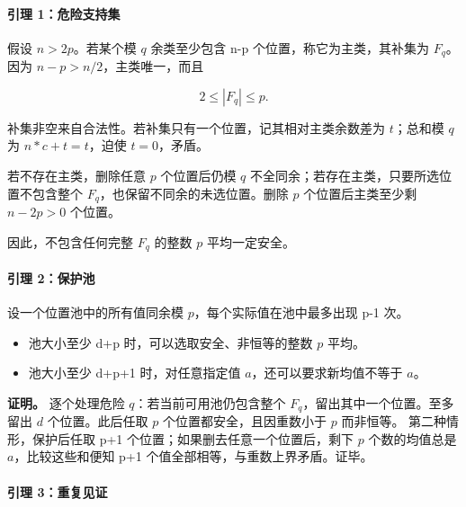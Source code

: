 \documentclass[11pt,a4paper]{article}
\newcommand{\tightlist}{\setlength{\itemsep}{0pt}\setlength{\parskip}{0pt}}
\theoremstyle{definition}
\numberwithin{equation}{section}
\begin{document}
\paragraph*{\texorpdfstring{{引理} {1：危险支持集}}{引理 1：危险支持集}}\label{C1-h2}

{假设} {\ensuremath{n>2p}。若某个模} {\ensuremath{q}} {余类至少包含} {n-p} {个位置，称它为主类，其补集为} {\ensuremath{F_{q}}。} {因为} {\ensuremath{n-p>n/2}，主类唯一，而且}

\[
2\le |F_q|\le p.
\]

{补集非空来自合法性。若补集只有一个位置，记其相对主类余数差为} {\ensuremath{t}；总和模} {\ensuremath{q}} {为} {\ensuremath{n*c+t=t}，迫使} {\ensuremath{t=0}，矛盾。}

{若不存在主类，删除任意} {\ensuremath{p}} {个位置后仍模} {\ensuremath{q}} {不全同余；若存在主类，只要所选位置不包含整个} {\ensuremath{F_{q}}，也保留不同余的未选位置。删除} {\ensuremath{p}} {个位置后主类至少剩} {\ensuremath{n-2p>0}} {个位置。}

{因此，不包含任何完整} {\ensuremath{F_{q}}} {的整数} {\ensuremath{p}} {平均一定安全。}

\paragraph*{\texorpdfstring{{引理} {2：保护池}}{引理 2：保护池}}\label{C1-h3}

{设一个位置池中的所有值同余模} {\ensuremath{p}，每个实际值在池中最多出现} {p-1} {次。}

\begin{itemize}
\tightlist
\item
  {池大小至少} {d+p} {时，可以选取安全、非恒等的整数} {\ensuremath{p}} {平均。}
\item
  {池大小至少} {d+p+1} {时，对任意指定值} {\ensuremath{a}，还可以要求新均值不等于} {\ensuremath{a}。}
\end{itemize}

\textbf{{证明。}} {逐个处理危险} {\ensuremath{q}：若当前可用池仍包含整个} {\ensuremath{F_{q}}，留出其中一个位置。至多留出} {\ensuremath{d}} {个位置。此后任取} {\ensuremath{p}} {个位置都安全，且因重数小于} {\ensuremath{p}} {而非恒等。} {第二种情形，保护后任取} {p+1} {个位置；如果删去任意一个位置后，剩下} {\ensuremath{p}} {个数的均值总是} {\ensuremath{a}，比较这些和便知} {p+1} {个值全部相等，与重数上界矛盾。证毕。}

\paragraph*{\texorpdfstring{{引理} {3：重复见证}}{引理 3：重复见证}}\label{C1-h4}
\end{document}
